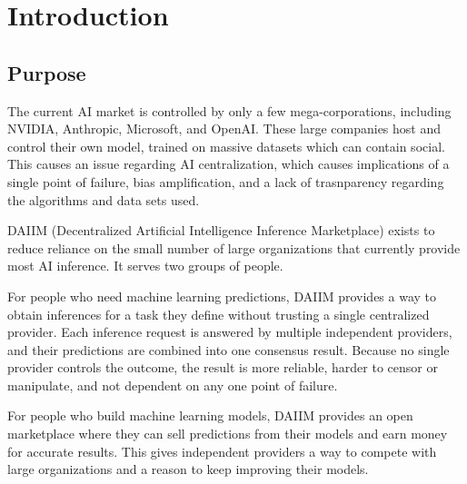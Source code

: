 \documentclass[12pt]{article}
\begin{document}
\section{Introduction} 




\subsection{Purpose}

The current AI market is controlled by only a few mega-corporations, including NVIDIA, Anthropic, Microsoft, and OpenAI. These large companies host and control their own model, trained on massive datasets which can contain social. This causes an issue regarding AI centralization, which causes implications of a single point of failure, bias amplification, and a lack of trasnparency regarding the algorithms and data sets used.

DAIIM (Decentralized Artificial Intelligence Inference Marketplace) exists to reduce reliance on the small number of large organizations that currently provide most AI inference. It serves two groups of people.

For people who need machine learning predictions, DAIIM provides a way to obtain inferences for a task they define without trusting a single centralized provider. Each inference request is answered by multiple independent providers, and their predictions are combined into one consensus result. Because no single provider controls the outcome, the result is more reliable, harder to censor or manipulate, and not dependent on any one point of failure.

For people who build machine learning models, DAIIM provides an open marketplace where they can sell predictions from their models and earn money for accurate results. This gives independent providers a way to compete with large organizations and a reason to keep improving their models.
\end{document}
